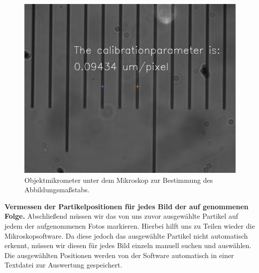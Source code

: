 \begin{figure}[H]
  \centering
  \includegraphics[width=.66\textwidth]{files/Calibration.png}
  \caption{Objektmikrometer unter dem Mikroskop zur Bestimmung des Abbildungsmaßstabs.}
  \label{fig:calibration}
\end{figure}
\textbf{Vermessen der Partikelpositionen für jedes Bild der auf genommenen Folge.} Abschließend müssen wir das von uns zuvor ausgewählte Partikel auf jedem der aufgenommenen Fotos markieren. Hierbei hilft uns zu Teilen wieder die Mikroskopsoftware. Da diese jedoch das ausgewählte Partikel nicht automatisch erkennt, müssen wir diesen für jedes Bild einzeln manuell suchen und auswählen. Die ausgewählten Positionen werden von der Software automatisch in einer Textdatei zur Auswertung gespeichert.